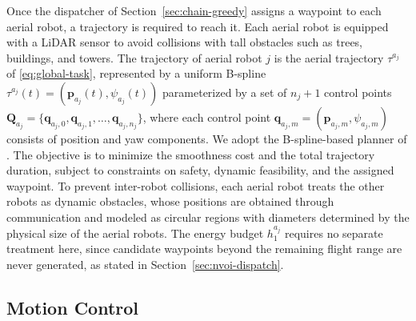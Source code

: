 Once the dispatcher of Section~\ref{sec:chain-greedy} assigns a waypoint to each aerial robot, a trajectory is required to reach it. Each aerial robot is equipped with a LiDAR sensor to avoid collisions with tall obstacles such as trees, buildings, and towers. The trajectory of aerial robot $j$ is the aerial trajectory $\tau^{a_j}$ of \eqref{eq:global-task}, represented by a uniform B-spline $\tau^{a_j}(t) = (\mathbf{p}_{a_j}(t), \psi_{a_j}(t))$ parameterized by a set of $n_j + 1$ control points $\mathbf{Q}_{a_j} = \{\mathbf{q}_{a_j,0}, \mathbf{q}_{a_j,1}, \dots, \mathbf{q}_{a_j,n_j}\}$, where each control point $\mathbf{q}_{a_j,m} = (\mathbf{p}_{a_j,m}, \psi_{a_j,m})$ consists of position and yaw components. We adopt the B-spline-based planner of \cite{zhou2021fuel}. The objective is to minimize the smoothness cost and the total trajectory duration, subject to constraints on safety, dynamic feasibility, and the assigned waypoint. To prevent inter-robot collisions, each aerial robot treats the other robots as dynamic obstacles, whose positions are obtained through communication and modeled as circular regions with diameters determined by the physical size of the aerial robots. The energy budget $h_1^{a_j}$ requires no separate treatment here, since candidate waypoints beyond the remaining flight range are never generated, as stated in Section~\ref{sec:nvoi-dispatch}.

\subsection{Motion Control}
\label{sec:motion-control}

